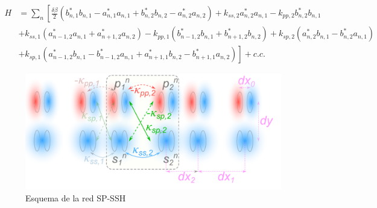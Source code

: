 \begin{align*}
	H &= \sum_n \left[\frac{\delta\beta}{2} \left( b^*_{n, 1} b_{n, 1} - a^*_{n, 1} a_{n, 1} + b^*_{n, 2} b_{n, 2} - a^*_{n, 2} a_{n, 2} \right) +k_{ss, 2}a^*_{n, 2} a_{n, 1} -k_{pp, 2}b^*_{n, 2} b_{n, 1} \right. 
	\\	
	&+ k_{ss, 1} \left( a_{n-1, 2}^*a_{n, 1} + a_{n+1, 2}^*a_{n, 2} \right) - k_{pp, 1} \left( b_{n-1, 2}^*b_{n, 1} + b_{n+1, 2}^*b_{n, 2} \right) + k_{sp, 2} \left( a_{n, 2}^* b_{n, 1} - b_{n, 2}^* a_{n, 1} \right)
	\\
	&+ \left. k_{sp, 1} \left( a_{n-1, 2}^* b_{n, 1} - b_{n-1, 2}^* a_{n, 1} + a_{n+1, 1}^*b_{n, 2} - b_{n+1, 1}^* a_{n, 2} \right) \right] + c.c.
\end{align*}

\begin{figure}[H]
\centering
	\includegraphics[width=0.7\linewidth]{media/ssh_sp_model}
	\caption{Esquema de la red SP-SSH}
\end{figure}